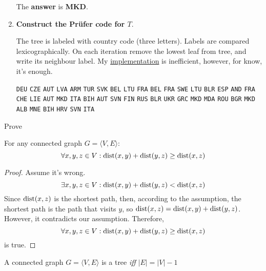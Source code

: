\documentclass[12pt, a4paper]{article}
\begin{document}
\begin{enumerate}[label=\alph*)]
The \textbf{answer} is \textbf{MKD}.

\item \textbf{Construct the Pr\"ufer code for \(T\)}.

The tree is labeled with country code (three letters). Labels are compared lexicographically.
On each iteration remove the lowest leaf from tree, and write its neighbour label.
My
\href{https://github.com/ablearthy-itmo-39828cf299f04949c86/discrete-math-2-hw-1/blob/b4044c9/auto/prufer_code.py}{implementation}
is inefficient, however, for know, it's enough.

\texttt{DEU} \texttt{CZE} \texttt{AUT} \texttt{LVA} \texttt{ARM} \texttt{TUR} \texttt{SVK} \texttt{BEL} \texttt{LTU} \texttt{FRA} \texttt{BEL} \texttt{FRA} \texttt{SWE} \texttt{LTU} \texttt{BLR} \texttt{ESP} \texttt{AND} \texttt{FRA} \texttt{CHE} \texttt{LIE} \texttt{AUT} \texttt{MKD} \texttt{ITA} \texttt{BIH} \texttt{AUT} \texttt{SVN} \texttt{FIN} \texttt{RUS} \texttt{BLR} \texttt{UKR} \texttt{GRC} \texttt{MKD} \texttt{MDA} \texttt{ROU} \texttt{BGR} \texttt{MKD} \texttt{ALB} \texttt{MNE} \texttt{BIH} \texttt{HRV} \texttt{SVN} \texttt{ITA}
\end{enumerate}

\problem Prove

\begin{theorem}
For any connected graph \(G = \langle V, E \rangle\):
\[\forall x,y,z \in V : \operatorname{dist}(x, y) + \operatorname{dist}(y, z) \ge \operatorname{dist}(x, z)\]
\end{theorem}

\begin{proof}
Assume it's wrong.
\[\exists x,y,z \in V : \operatorname{dist}(x, y) + \operatorname{dist}(y, z) < \operatorname{dist}(x, z)\]
Since \(\operatorname{dist}(x, z)\) is the shortest path, then, according to the assumption,
the shortest path is the path that visits \(y\), so \(\operatorname{dist}(x, z) = \operatorname{dist}(x, y) + \operatorname{dist}(y, z)\).
However, it contradicts our assumption. Therefore,
\[\forall x,y,z \in V : \operatorname{dist}(x, y) + \operatorname{dist}(y, z) \ge \operatorname{dist}(x, z)\]
is true.
\end{proof}

\begin{theorem}[Tree]
A connected graph \(G = \langle V, E \rangle\) is a tree \textit{iff} \(|E| = |V| - 1\)
\end{theorem}
\end{document}
